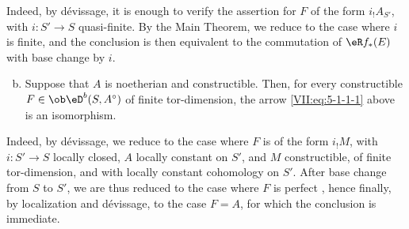 Indeed, by dévissage, it is enough to verify the assertion for $F$ of the
form $i_! A_{S'}$, with $i:S'\to S$ quasi-finite. By the Main Theorem, we
reduce to the case where $i$ is finite, and the conclusion is then equivalent
to the commutation of $\eR f_\ast(E)$ with base change by $i$.
\begin{enumerate}[a)]
\setcounter{enumi}{1}
  \item Suppose that $A$ is noetherian and constructible. Then, for every
    constructible $F\in\ob\eD^b(S,A^\circ)$ of finite tor-dimension, the arrow
    \eqref{VII:eq:5-1-1-1} above is an isomorphism.
\end{enumerate}

Indeed, by dévissage, we reduce to the case where $F$ is of the form $i_! M$,
with $i:S'\to S$ locally closed, $A$ locally constant on $S'$, and $M$
constructible, of finite tor-dimension, and with locally constant cohomology
on $S'$. After base change from $S$ to $S'$, we are thus reduced to the case
where $F$ is perfect , hence finally, by localization and
dévissage, to the case $F=A$, for which the conclusion is immediate.





\subsubsection{}\label{VII:5-1-3}

